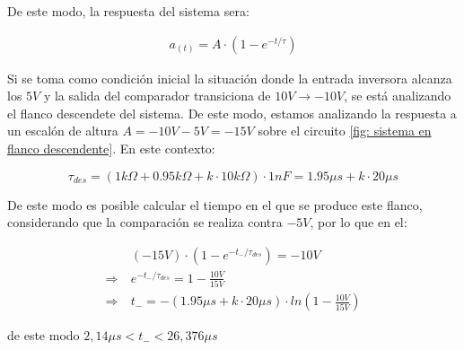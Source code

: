 De este modo, la respuesta del sistema sera:

\begin{align*}
    a_{(t)} = A \cdot (1 - e^{-t/\tau})
\end{align*}

Si se toma como condición inicial la situación donde la entrada inversora alcanza los $5V$ y la salida del comparador transiciona de $10V \rightarrow -10V$, se está analizando el flanco descendete del sistema. De este modo, estamos analizando la respuesta a un escalón de altura $A = -10V-5V=-15V$ sobre el circuito \ref{fig: sistema en flanco descendente}. En este contexto:

\begin{equation}
    \tau_{des} = (1k\Omega + 0.95k\Omega + k \cdot 10k\Omega) \cdot 1nF = 1.95\mu s + k \cdot 20\mu s
\end{equation}

De este modo es posible calcular el tiempo en el que se produce este flanco, considerando que la comparación se realiza contra $-5V$, por lo que en el:

\begin{align*}
    &(-15V) \cdot (1 - e^{-t_-/\tau_{des}}) = -10V \\
\Longrightarrow \: & e^{-t_-/\tau_{des}} = 1 - \frac{10V}{15V} \\
\Longrightarrow \: & t_- = -(1.95\mu s + k \cdot 20\mu s) \cdot ln\left(1 - \frac{10V}{15V}\right)
\end{align*}

\noindent de este modo  $ 2,14\mu s< t_- <26,376\mu s$


